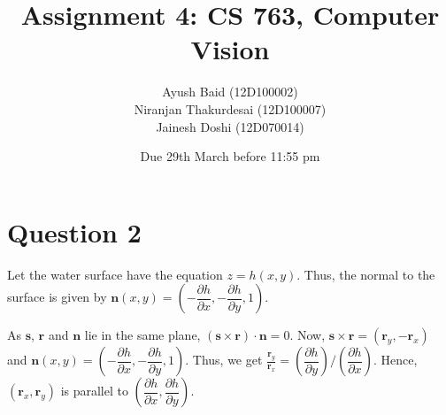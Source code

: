 \documentclass[11pt]{article}
\title{Assignment 4: CS 763, Computer Vision}
\author{Ayush Baid (12D100002) \\
Niranjan Thakurdesai (12D100007) \\
Jainesh Doshi (12D070014)}
\date{Due 29th March before 11:55 pm}
\begin{document}
\maketitle

\section*{Question 2}

Let the water surface have the equation $z = h(x,y)$. Thus, the normal to the surface is given by $\mathbf{n}(x,y) = \left( -\dfrac{\partial h}{\partial x},-\dfrac{\partial h}{\partial y},1 \right)$.

As $\mathbf{s}$, $\mathbf{r}$ and $\mathbf{n}$ lie in the same plane, $(\mathbf{s}\times\mathbf{r})\cdot\mathbf{n}=0$. Now, $\mathbf{s}\times\mathbf{r} = (\mathbf{r}_y,-\mathbf{r}_x)$ and $\mathbf{n}(x,y) = \left( -\dfrac{\partial h}{\partial x},-\dfrac{\partial h}{\partial y},1 \right)$. Thus, we get $\frac{\mathbf{r}_y}{\mathbf{r}_x} = \left(\dfrac{\partial h}{\partial y}\right)/\left(\dfrac{\partial h}{\partial x}\right)$. Hence, $(\mathbf{r}_x,\mathbf{r}_y)$ is parallel to $(\dfrac{\partial h}{\partial x},\dfrac{\partial h}{\partial y})$.
\end{document}
